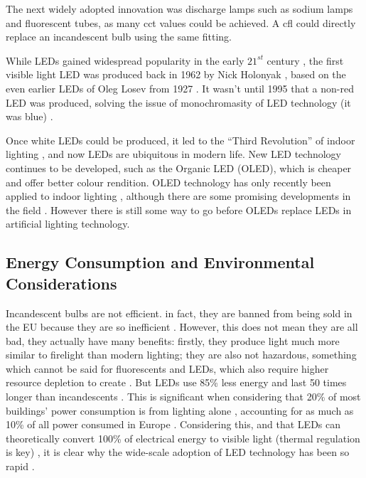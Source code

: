 The next widely adopted innovation was discharge lamps such as sodium lamps and fluorescent tubes, as many \acrfull{cct} values could be achieved. A \acrfull{cfl} could directly replace an incandescent bulb using the same fitting.

While LEDs gained widespread popularity in the early $21^{st}$ century \citep{matsumotoMeasuringHouseholdAbility2020}, the first visible light LED was produced back in 1962 by Nick Holonyak \citep{holonyakCOHERENTVISIBLELIGHT1962}, based on the even earlier LEDs of Oleg Losev from 1927 \citep{zheludevLifeTimesLED2007}. It wasn't until 1995 that a non-red LED was produced, solving the issue of monochromasity of LED technology (it was blue) \citep{nakamuraInGaNAlGaNBlue1995}.

Once white LEDs could be produced, it led to the ``Third Revolution'' of indoor lighting \citep{montoyaIndoorLightingTechniques2017}, and now LEDs are ubiquitous in modern life. New LED technology continues to be developed, such as the Organic LED (OLED), which is cheaper and offer better colour rendition. OLED technology has only recently been applied to indoor lighting \citep{phelanOLEDLightingHits2018}, although there are some promising developments in the field \citep{benderSolidStateLightingConcise2015}. However there is still some way to go before OLEDs replace LEDs in artificial lighting technology.

\subsection{Energy Consumption and Environmental Considerations}
\label{sec:Energy}

Incandescent bulbs are not efficient. in fact, they are banned from being sold in the EU because they are so inefficient \citep{euDirective2012272012}. However, this does not mean they are all bad, they actually have many benefits: firstly, they produce light much more similar to firelight than modern lighting; they are also not hazardous, something which cannot be said for fluorescents and LEDs, which also require higher resource depletion to create \citep{limPotentialEnvironmentalImpacts2013}. But LEDs use 85\% less energy and last 50 times longer than incandescents \citep{mottierLEDLightingApplications2010}. This is significant when considering that 20\% of most buildings' power consumption is from lighting alone \citep{perez-lombardReviewBuildingsEnergy2008}, accounting for as much as 10\% of all power consumed in Europe \citep{bertoldiEnergyEfficiencyStatus2012}. Considering  this, and that LEDs can theoretically convert 100\% of electrical energy to visible light (thermal regulation is key) \citep{jordanChallengesLEDPackaging2012}, it is clear why the wide-scale adoption of LED technology has been so rapid \citep{matsumotoMeasuringHouseholdAbility2020}.



